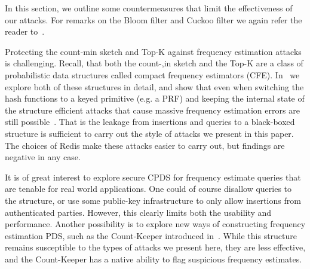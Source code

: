 In this section, we outline some countermeasures that limit the effectiveness of our attacks. For remarks on the Bloom filter and Cuckoo filter we again refer the reader to~\cite{cryptoeprint:2024/1312}.

Protecting the count-min sketch and Top-K against frequency estimation attacks is challenging. Recall, that both the count-,in sketch and the Top-K are a class of probabilistic data structures called compact frequency estimators (CFE). In~ we explore both of these structures in detail, and show that even when switching the hash functions to a keyed primitive (e.g. a PRF) and keeping the internal state of the structure efficient attacks that cause massive frequency estimation errors are still possible~\cite{markelon23}. That is the leakage from insertions and queries to a black-boxed structure is sufficient to carry out the style of attacks we present in this paper. The choices of Redis make these attacks easier to carry out, but findings are negative in any case. 

It is of great interest to explore secure CPDS for frequency estimate queries that are tenable for real world applications. One could of course disallow queries to the structure, or use some public-key infrastructure to only allow insertions from authenticated parties. However, this clearly limits both the usability and performance. Another possibility is to explore new ways of constructing frequency estimation PDS, such as the Count-Keeper introduced in~\cite{markelon23}. While this structure remains susceptible to the types of attacks we present here, they are less effective, and the Count-Keeper has a native ability to flag suspicious frequency estimates. 


